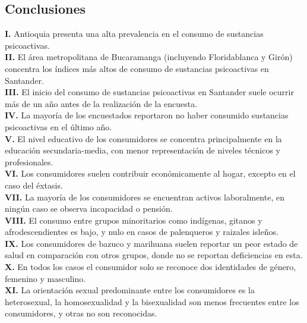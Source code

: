 \documentclass[
]{article}
\begin{document}
\subsection{Conclusiones}\label{conclusiones}

\textbf{I.} Antioquia presenta una alta prevalencia en el consumo de
sustancias psicoactivas.\\

\textbf{II.} El área metropolitana de Bucaramanga (incluyendo
Floridablanca y Girón) concentra los índices más altos de consumo de
sustancias psicoactivas en Santander.\\

\textbf{III.} El inicio del consumo de sustancias psicoactivas en
Santander suele ocurrir más de un año antes de la realización de la
encuesta.\\

\textbf{IV.} La mayoría de los encuestados reportaron no haber consumido
sustancias psicoactivas en el último año.\\

\textbf{V.} El nivel educativo de los consumidores se concentra
principalmente en la educación secundaria-media, con menor
representación de niveles técnicos y profesionales.\\

\textbf{VI.} Los consumidores suelen contribuir económicamente al hogar,
excepto en el caso del éxtasis.\\

\textbf{VII.} La mayoría de los consumidores se encuentran activos
laboralmente, en ningún caso se observa incapacidad o pensión.\\

\textbf{VIII.} El consumo entre grupos minoritarios como indígenas,
gitanos y afrodescendientes es bajo, y nulo en casos de palenqueros y
raizales isleños.\\

\textbf{IX.} Los consumidores de bazuco y marihuana suelen reportar un
peor estado de salud en comparación con otros grupos, donde no se
reportan deficiencias en esta.\\

\textbf{X.} En todos los casos el consumidor solo se reconoce dos
identidades de género, femenino y masculino.\\

\textbf{XI.} La orientación sexual predominante entre los consumidores
es la heterosexual, la homosexualidad y la bisexualidad son menos
frecuentes entre los consumidores, y otras no son reconocidas.\\
\end{document}
